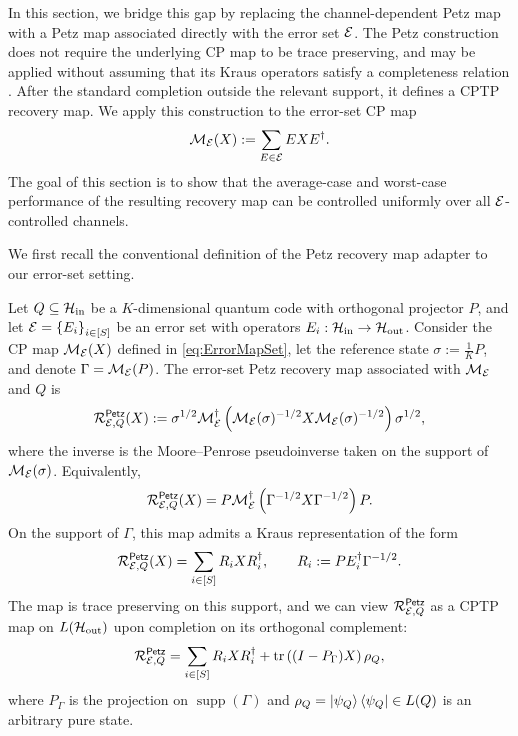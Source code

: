 \documentclass[10pt]{article}
\DeclareMathOperator{\supp}{supp}
\newcommand{\SIN}{\mathrm{in}}
\newcommand{\SOUT}{\mathrm{out}}
\newcommand{\tr}{\mathrm{tr}}
\newcommand{\p}[1]{\left(#1\right)}
\newcommand{\ppp}[1]{\left\{#1\right\}}
\newcommand{\s}[1]{\mathsf{#1}}
\begin{document}
In this section, we bridge this gap by replacing the channel-dependent Petz map with a Petz map associated directly with the error set ${\cal E}$. The Petz construction does not require the underlying CP map to be trace preserving, and may be applied without assuming that its Kraus operators satisfy a completeness relation \cite{barnum2002reversing,ng2010simple,afham2026projections}. After the standard completion outside the relevant support, it defines a CPTP recovery map. We apply this construction to the error-set CP map
\begin{equation}
    {\cal M}_{{\cal E}}(X):=\sum_{E\in{\cal E}}EXE^\dag. \label{eq:ErrorMapSet}
\end{equation}
The goal of this section is to show that the average-case and worst-case performance of the resulting recovery map can be controlled uniformly over all ${\cal E}$-controlled channels.

We first recall the conventional definition of the Petz recovery map adapter to our error-set setting.

\begin{definition}\label{def:errorSetPetz}
Let $Q\subseteq\calH_{\SIN}$ be a $K$-dimensional quantum code with orthogonal projector $P$, and let $\calE=\ppp{E_i}_{i\in[S]}$ be an error set with operators $E_i:\calH_{\SIN}\to\calH_{\SOUT}$. Consider the CP map ${\cal M}_{{\cal E}}(X)$ defined in \eqref{eq:ErrorMapSet}, let the reference state $\sigma:=\frac{1}{K}P$, and denote $\Gamma={\cal M}_{{\cal E}}(P)$. The error-set Petz recovery map associated with ${\cal M}_{{\cal E}}$ and $Q$ is
\[ \calR_{\calE,Q}^{\s{Petz}}(X) := \sigma^{1/2}
\calM_{\calE}^{\dag}\p{ \calM_{\calE}(\sigma)^{-1/2} X \calM_{\calE}(\sigma)^{-1/2}}\sigma^{1/2}, \]
where the inverse is the Moore--Penrose pseudoinverse taken on the support of ${\cal M}_{{\cal E}}(\sigma)$. Equivalently,
\[ \calR_{\calE,Q}^{\s{Petz}}(X) = P\calM_{\calE}^{\dag}\p{ \Gamma^{-1/2} X \Gamma^{-1/2} }P. \]
On the support of $\Gamma$, this map admits a Kraus representation of the form
\begin{equation}
    \calR_{\calE,Q}^{\s{Petz}}(X) = \sum_{i\in[S]}R_iXR_i^\dag, \qquad R_i:=PE_i^\dag\Gamma^{-1/2}.\label{eq:KrausSetPetz}
\end{equation}
The map is trace preserving on this support, and we can view $\calR_{\calE,Q}^{\s{Petz}}$ as a CPTP map on $L(\calH_{\SOUT})$ upon completion on its orthogonal complement:
\[\calR_{\calE,Q}^{\s{Petz}}= \sum_{i\in[S]}R_iXR_i^\dag+ \tr\p{(I-P_{\Gamma})X}\rho_Q,\]
where $P_{\Gamma}$ is the projection on $\supp(\Gamma)$ and $\rho_Q=\ket{\psi_{Q}}\bra{\psi_Q}\in L(Q)$ is an arbitrary pure state. 
\end{definition}
\end{document}
